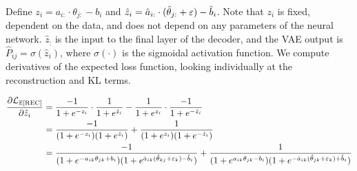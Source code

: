 \documentclass[letterpaper]{article}
\def \e{\ensuremath \varepsilon}
\theoremstyle{definition}
\begin{document}
Define $z_i = a_{i:} \cdot \theta_{j:} - b_i$ and $\hat z_i = \hat a_{i:} \cdot (\hat \theta_{j:} + \e) - \hat b_i$. Note that $z_i$ is fixed, dependent on the data, and does not depend on any parameters of the neural network. $\hat z_:$ is the input to the final layer of the decoder, and the VAE output is $\hat P_{ij} = \sigma(\hat z_i)$, where $\sigma(\cdot)$ is the sigmoidal activation function. We compute derivatives of the expected loss function, looking individually at the reconstruction and KL terms. 

\begin{align}
  \frac{\partial \mathcal{L}_{\mathbb{E}[\text{REC}]}}{\partial \hat z_i} &= \frac{-1}{1 + e^{-z_i}}\cdot \frac{1}{1 + e^{\hat z_i}} - \frac{1}{1 + e^{z_i}}\cdot \frac{-1}{1 + e^{-\hat z_i}} \\
  &= \frac{-1}{(1 + e^{-z_i})(1 + e^{\hat z_i})} + \frac{1}{(1 + e^{z_i})(1 + e^{-\hat z_i})} \\
  &= \frac{-1}{(1 + e^{-a_{ik}\theta_{jk} + b_i})(1 + e^{\hat a_{ik} (\hat \theta_{kj} + \e_k) - \hat b_i})} + \frac{1}{(1 + e^{a_{ik}\theta_{jk} - b_i})(1 + e^{-\hat a_{ik}(\hat \theta_{jk} + \e_k) + \hat b_i})} 
  \label{eq:z_deriv}
\end{align}
\end{document}
